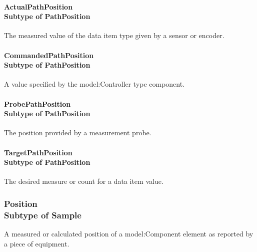 \paragraph[ActualPathPosition]{ActualPathPosition \\ {\small Subtype of PathPosition}}\mbox{}
  \label{type:ActualPathPosition}

\FloatBarrier

The measured value of the data item type given by a sensor or encoder.

\paragraph[CommandedPathPosition]{CommandedPathPosition \\ {\small Subtype of PathPosition}}\mbox{}
  \label{type:CommandedPathPosition}

\FloatBarrier

A value specified by the {model:Controller} type component.

\paragraph[ProbePathPosition]{ProbePathPosition \\ {\small Subtype of PathPosition}}\mbox{}
  \label{type:ProbePathPosition}

\FloatBarrier

The position provided by a measurement probe.

\paragraph[TargetPathPosition]{TargetPathPosition \\ {\small Subtype of PathPosition}}\mbox{}
  \label{type:TargetPathPosition}

\FloatBarrier

The desired measure or count for a data item value.

\FloatBarrier
\subsubsection[Position]{Position \\ {\small Subtype of Sample}}
  \label{type:Position}

\FloatBarrier

A measured or calculated position of a {model:Component} element as reported by a piece of equipment.

